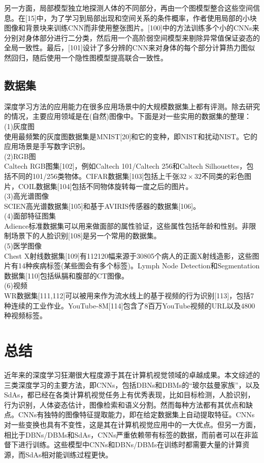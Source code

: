 \documentclass[a4paper]{article}
\begin{document}
另一方面，局部模型独立地探测人体的不同部分，再由一个图模型整合这些空间信息。在[15]中，为了学习到局部出现和空间关系的条件概率，作者使用局部的小块图像和背景块来训练CNN而非使用整张图片。[100]中的方法训练多个小的CNNs来分别对身体部分进行二分类，然后用一个高阶弱空间模型来剔除异常值保证姿态的全局一致性。最后，[101]设计了多分辨的CNN来对身体的每个部分计算热力图似然回归，随后使用一个隐性图模型提高联合一致性。

\subsection{数据集}
深度学习方法的应用能力在很多应用场景中的大规模数据集上都有评测。除去研究的情况，主要应用领域是在(自然)图像中。下面是对一些实用的数据集的整理：\\
(1)灰度图\\
使用最频繁的灰度图数据集是MNIST[20]和它的变种，即NIST和扰动NIST。它的应用场景是手写数字识别。\\
(2)RGB图\\
Caltech RGB图集[102]，例如Caltech 101/Caltech 256和Caltech Silhouettes，包括不同的101/256类物体。CIFAR数据集[103]包括上千张$32\times 32$不同类的彩色图片，COIL数据集[104]包括不同物体旋转每一度之后的图片。\\
(3)高光谱图像\\
SCIEN高光谱数据集[105]和基于AVIRIS传感器的数据集[106]。\\
(4)面部特征图集\\
Adience标准数据集可以用来做面部的属性验证，这些属性包括年龄和性别。非限制场景下的人脸识别[108]是另一个常用的数据集。\\
(5)医学图像\\
Chest X射线数据集[109]有112120幅来源于30805个病人的正面X射线造影，这些图片有14种疾病标签(某些图会有多个标签)。Lymph Node Detection和Segmentation数据集[110]包括纵膈和腹部的CT图像。\\
(6)视频\\
WR数据集[111,112]可以被用来作为流水线上的基于视频的行为识别[113]，包括7种连续的工业作业。YouTube-8M[114]包含了8百万YouTube视频的URL以及4800种视频标签。\\

\section{总结}
近年来的深度学习狂潮很大程度源于其在计算机视觉领域的卓越成果。本文综述的三类深度学习的主要方法，即CNNs，包括DBNs和DBMs的“玻尔兹曼家族”，以及SdAs，都已经在各类计算机视觉任务上有优秀表现，比如目标检测，人脸识别，行为识别，人体姿态估计，图像检索和语义分割。然而每种方法都有其优点和缺点。CNNs有独特的图像特征提取能力，即在给定数据集上自动提取特征。CNNs对一些变换也具有不变性，这是其在计算机视觉应用中的一大优点。但另一方面，相比于DBNs/DBMs和SdAs，CNNs严重依赖带有标签的数据，而前者可以在非监督下进行训练。这些模型中CNNs和DBNs/DBMs在训练时都需要大量的计算资源，而SdAs相对能训练过程更快。
\end{document}
